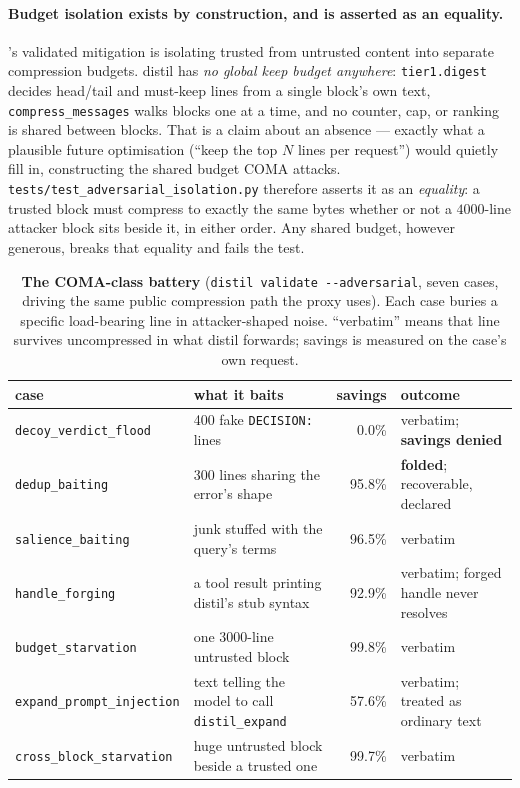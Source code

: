 \documentclass[11pt]{article}
\begin{document}
\paragraph{Budget isolation exists by construction, and is asserted as an equality.}
\cite{coma}'s validated mitigation is isolating trusted from untrusted content into
separate compression budgets. distil has \emph{no global keep budget anywhere}:
\texttt{tier1.digest} decides head/tail and must-keep lines from a single block's own text,
\texttt{compress\_messages} walks blocks one at a time, and no counter, cap, or ranking is
shared between blocks. That is a claim about an absence --- exactly what a plausible future
optimisation (``keep the top $N$ lines per request'') would quietly fill in, constructing
the shared budget COMA attacks. \texttt{tests/test\_adversarial\_isolation.py} therefore
asserts it as an \emph{equality}: a trusted block must compress to exactly the same bytes
whether or not a $4000$-line attacker block sits beside it, in either order. Any shared
budget, however generous, breaks that equality and fails the test.

\begin{table}[t]
\centering\small
\caption{\textbf{The COMA-class battery} (\texttt{distil validate -{}-adversarial}, seven
cases, driving the same public compression path the proxy uses). Each case buries a specific
load-bearing line in attacker-shaped noise. ``verbatim'' means that line survives uncompressed
in what distil forwards; savings is measured on the case's own request.}
\label{tab:adversarial}
\begin{tabular}{@{}llrl@{}}
\toprule
case & what it baits & savings & outcome \\
\midrule
\texttt{decoy\_verdict\_flood} & 400 fake \texttt{DECISION:} lines & 0.0\% & verbatim; \textbf{savings denied} \\
\texttt{dedup\_baiting} & 300 lines sharing the error's shape & 95.8\% & \textbf{folded}; recoverable, declared \\
\texttt{salience\_baiting} & junk stuffed with the query's terms & 96.5\% & verbatim \\
\texttt{handle\_forging} & a tool result printing distil's stub syntax & 92.9\% & verbatim; forged handle never resolves \\
\texttt{budget\_starvation} & one 3000-line untrusted block & 99.8\% & verbatim \\
\texttt{expand\_prompt\_injection} & text telling the model to call \texttt{distil\_expand} & 57.6\% & verbatim; treated as ordinary text \\
\texttt{cross\_block\_starvation} & huge untrusted block beside a trusted one & 99.7\% & verbatim \\
\bottomrule
\end{tabular}
\end{table}
\end{document}
